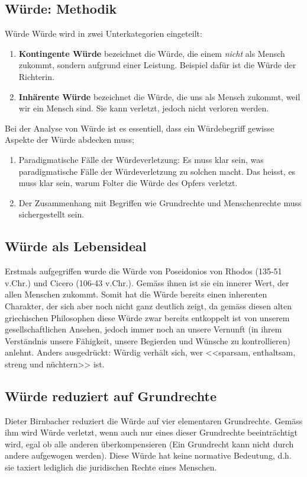 \documentclass[../main.tex]{subfiles}
\begin{document}
\subsection{Würde: Methodik}
Würde Würde wird in zwei Unterkategorien eingeteilt:
\begin{enumerate}
	\item \textbf{Kontingente Würde} bezeichnet die Würde, die einem  \textit{nicht} als Mensch zukommt, sondern aufgrund einer Leistung. Beispiel dafür ist die Würde der Richterin.
	\item \textbf{Inhärente Würde} bezeichnet die Würde, die uns als Mensch zukommt, weil wir ein Mensch sind. Sie kann verletzt, jedoch nicht verloren werden. 
\end{enumerate}

Bei der Analyse von Würde ist es essentiell, dass ein Würdebegriff gewisse Aspekte der Würde abdecken muss;
\begin{enumerate}
	\item Paradigmatische Fälle der Würdeverletzung: Es muss klar sein, was paradigmatische Fälle der Würdeverletzung zu solchen macht. Das heisst, es muss klar sein, warum Folter die Würde des Opfers verletzt. 
	\item Der Zusammenhang mit Begriffen wie Grundrechte und Menschenrechte muss sichergestellt sein. 
\end{enumerate}

\subsection{Würde als Lebensideal}
Erstmals aufgegriffen wurde die Würde von Poseidonios von Rhodos (135-51 v.Chr.) und Cicero (106-43 v.Chr.). Gemäss ihnen ist sie ein innerer Wert, der allen Menschen zukommt. Somit hat die Würde bereits einen inherenten Charakter, der sich aber noch nicht ganz deutlich zeigt, da gemäss diesen alten griechischen Philosophen diese Würde zwar bereits entkoppelt ist von unserem gesellschaftlichen Ansehen, jedoch immer noch an unsere Vernunft (in ihrem Verständnis unsere Fähigkeit, unsere Begierden und Wünsche zu kontrollieren) anlehnt. Anders ausgedrückt: Würdig verhält sich, wer <<sparsam, enthaltsam, streng und nüchtern>> ist. 

\subsection{Würde reduziert auf Grundrechte}
Dieter Birnbacher reduziert die Würde auf vier elementaren Grundrechte. Gemäss ihm wird Würde verletzt, wenn auch nur eines dieser Grundrechte beeinträchtigt wird, egal ob alle anderen überkompensieren (Ein Grundrecht kann nicht durch andere aufgewogen werden). Diese Würde hat keine normative Bedeutung, d.h. sie taxiert lediglich die juridischen Rechte eines Menschen. 
\end{document}
